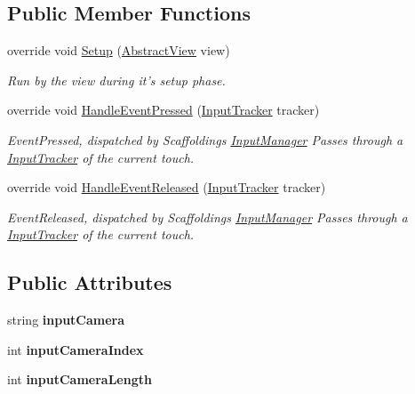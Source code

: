 \subsection*{Public Member Functions}
\begin{DoxyCompactItemize}
\item 
override void \hyperlink{class_scaffolding_1_1_rotate_this_input_a9e0fc73644310f1efd1f49e692638c89}{Setup} (\hyperlink{class_scaffolding_1_1_abstract_view}{Abstract\+View} view)
\begin{DoxyCompactList}\small\item\em Run by the view during it's setup phase. \end{DoxyCompactList}\item 
override void \hyperlink{class_scaffolding_1_1_rotate_this_input_a721eb598cb78a1abb06d8c37f9de01ea}{Handle\+Event\+Pressed} (\hyperlink{class_scaffolding_1_1_input_tracker}{Input\+Tracker} tracker)
\begin{DoxyCompactList}\small\item\em Event\+Pressed, dispatched by Scaffoldings \hyperlink{class_scaffolding_1_1_input_manager}{Input\+Manager} Passes through a \hyperlink{class_scaffolding_1_1_input_tracker}{Input\+Tracker} of the current touch. \end{DoxyCompactList}\item 
override void \hyperlink{class_scaffolding_1_1_rotate_this_input_aa90af18d3d575cb5a5176e3c952e68cd}{Handle\+Event\+Released} (\hyperlink{class_scaffolding_1_1_input_tracker}{Input\+Tracker} tracker)
\begin{DoxyCompactList}\small\item\em Event\+Released, dispatched by Scaffoldings \hyperlink{class_scaffolding_1_1_input_manager}{Input\+Manager} Passes through a \hyperlink{class_scaffolding_1_1_input_tracker}{Input\+Tracker} of the current touch. \end{DoxyCompactList}\end{DoxyCompactItemize}
\subsection*{Public Attributes}
\begin{DoxyCompactItemize}
\item 
\hypertarget{class_scaffolding_1_1_rotate_this_input_a2d2bf1c1f8339c1f2dba78c68888ba40}{string {\bfseries input\+Camera}}\label{class_scaffolding_1_1_rotate_this_input_a2d2bf1c1f8339c1f2dba78c68888ba40}

\item 
\hypertarget{class_scaffolding_1_1_rotate_this_input_afb50ecc538a545891be6647d1f615961}{int {\bfseries input\+Camera\+Index}}\label{class_scaffolding_1_1_rotate_this_input_afb50ecc538a545891be6647d1f615961}

\item 
\hypertarget{class_scaffolding_1_1_rotate_this_input_af55328f2f51d26f738238dec61eb308b}{int {\bfseries input\+Camera\+Length}}\label{class_scaffolding_1_1_rotate_this_input_af55328f2f51d26f738238dec61eb308b}

\end{DoxyCompactItemize}


